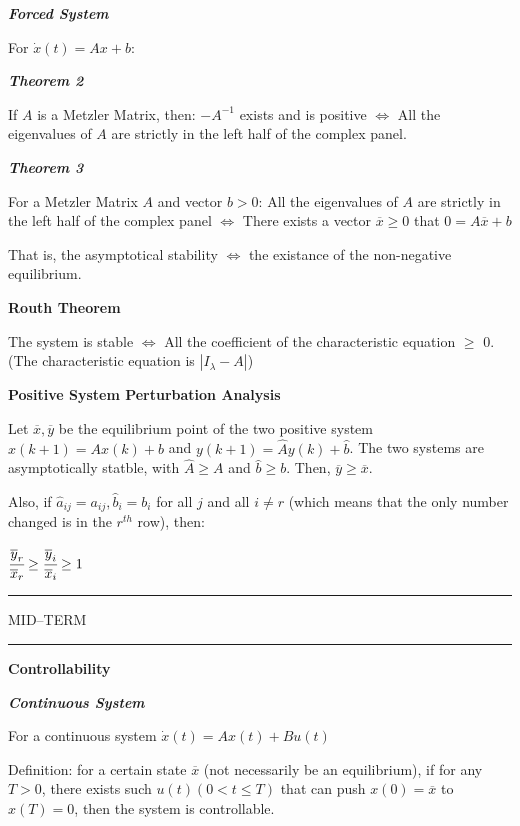 \documentclass{article}
\newcommand{\sectionline}{\color{black}\rule[2pt]{0.45\textwidth}{0.05em}\color{black}}
\newcommand{\bigtitle}[1]{
	\noindent
	\textbf{#1}
}
\newcommand{\smalltitle}[1]{
	\noindent
	\textbf{\textit{#1}}
}
\begin{document}
\begin{spacing}{1.2}
\smalltitle{Forced System}

For $\dot{x}(t)=A x+b$:


\smalltitle{Theorem 2}

If $A$ is a Metzler Matrix, then: $-A^{-1}$ exists and is positive $\Leftrightarrow$ All the eigenvalues of $A$ are strictly in the left half of the complex panel.


\smalltitle{Theorem 3}

For a Metzler Matrix $A$ and vector $b>0$: All the eigenvalues of $A$ are strictly in the left half of the complex panel $\Leftrightarrow$ There exists a vector $\overline{x} \geq 0$ that $0 = A\overline{x} +b$

That is, the asymptotical stability $\Leftrightarrow$ the existance of the non-negative equilibrium.

\bigtitle{Routh Theorem}

The system is stable $\Leftrightarrow$ All the coefficient of the characteristic equation $\geq$ 0. (The characteristic equation is $|I_\lambda - A|$)


\bigtitle{Positive System Perturbation Analysis}

Let $\overline{x}, \overline{y}$ be the equilibrium point of the two positive system $x(k+1)=A x(k)+b$ and $y(k+1)=\hat{A} y(k)+\hat{b}$. The two systems are asymptotically statble, with $\hat{A} \geq A$ and $\hat{b} \geq b$. Then, $\overline{y} \geq \overline{x}$.

Also, if $\hat{a}_{i j}=a_{i j}, \hat{b}_{i}=b_{i}$ for all $j$ and all $i \neq r$ (which means that the only number changed is in the $r^{th}$ row), then:

$\cfrac{\overline{y}_{r}}{\overline{x}_{r}} \geq \cfrac{\overline{y}_{i}}{\overline{x}_{i}} \geq 1$


\sectionline

\begin{center}
	\Huge MID--TERM
\end{center}

\sectionline


\bigtitle{Controllability}

\smalltitle{Continuous System}

For a continuous system $\dot{x}(t)=A x(t)+B u(t)$

Definition: for a certain state $\overline{x}$ (not necessarily be an equilibrium), if for any $T>0$, there exists such $u(t) (0<t\leq T)$ that can push $x(0) = \overline{x}$ to $x(T) = 0$, then the system is controllable.


\end{spacing}
\end{document}
